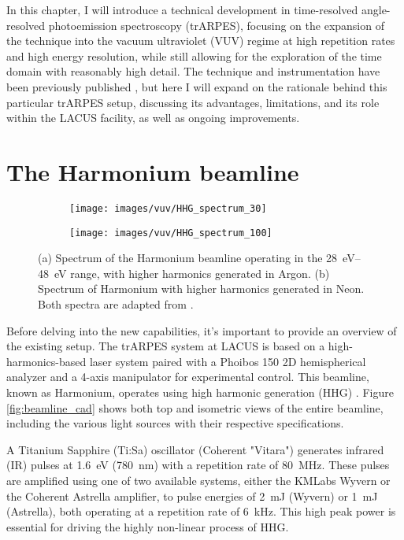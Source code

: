 In this chapter, I will introduce a technical development in time-resolved angle-resolved photoemission spectroscopy (trARPES), focusing on the expansion of the technique into the vacuum ultraviolet (VUV) regime at high repetition rates and high energy resolution, while still allowing for the exploration of the time domain with reasonably high detail.
The technique and instrumentation have been previously published \cite{hellbruck_high-resolution_2024}, but here I will expand on the rationale behind this particular trARPES setup, discussing its advantages, limitations, and its role within the LACUS facility, as well as ongoing improvements.

\section{The Harmonium beamline}

\begin{figure}
	\centering
	\begin{subfigure}[b]{0.45\textwidth}
		\texttt{[image: images/vuv/HHG\_spectrum\_30]}
		\caption{}
	\end{subfigure}
	\begin{subfigure}[b]{0.45\textwidth}
		\texttt{[image: images/vuv/HHG\_spectrum\_100]}
		\caption{}
	\end{subfigure}
	\caption{(a) Spectrum of the Harmonium beamline operating in the \qtyrange{28}{48}{\electronvolt} range, with higher harmonics generated in Argon. (b) Spectrum of Harmonium with higher harmonics generated in Neon. Both spectra are adapted from \cite{ojeda_harmonium_2015}.}
	\label{fig:hhgspectrum}
\end{figure}


Before delving into the new capabilities, it’s important to provide an overview of the existing setup.
The trARPES system at LACUS is based on a high-harmonics-based laser system paired with a Phoibos 150 2D hemispherical analyzer and a 4-axis manipulator for experimental control.
This beamline, known as Harmonium, operates using high harmonic generation (HHG) \cite{arrell_harmonium_2017}.
Figure \ref{fig:beamline_cad} shows both top and isometric views of the entire beamline, including the various light sources with their respective specifications.

A Titanium Sapphire (Ti:Sa) oscillator (Coherent "Vitara") generates infrared (IR) pulses at \qty{1.6}{\electronvolt} (\qty{780}{\nano\meter}) with a repetition rate of \qty{80}{\mega\hertz}. These pulses are amplified using one of two available systems, either the KMLabs Wyvern or the Coherent Astrella amplifier, to pulse energies of \qty{2}{\milli\joule} (Wyvern) or \qty{1}{\milli\joule} (Astrella), both operating at a repetition rate of \qty{6}{\kilo\hertz}.
This high peak power is essential for driving the highly non-linear process of HHG.

